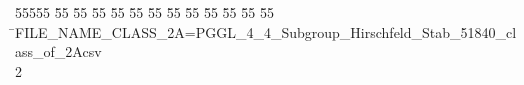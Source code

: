 %
%
\begin{tabbing}
55555 \= 55 \= 55 \= 55 \= 55 \= 55 \= 55 \= 55 \= 55 \= 55 \= 55 \= 55 \= 55 \= \>FILE\_NAME\_CLASS\_2A=PGGL\_4\_4\_Subgroup\_Hirschfeld\_Stab\_51840\_class\_of\_2Acsv\\[0pt]
2\>\end{tabbing}
